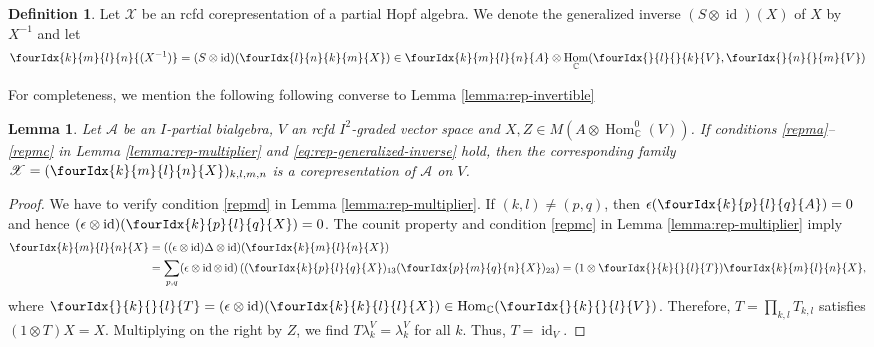\documentclass[11pt]{article}
\DeclareMathOperator{\id}{id}
\DeclareMathOperator{\Hom}{Hom}
\newcommand{\C}{\mathbb{C}}
\newcommand{\Gr}[5]{\fourIdx{#2}{#4}{#3}{#5}{#1}}%
\newcommand{\Gru}[3]{\Gr{#1}{}{}{#2}{#3}}
\newtheorem{Lem}[Theorem]{Lemma}
\theoremstyle{definition}
\newtheorem{Def}[Theorem]{Definition}
\numberwithin{equation}{section}
\begin{document}
\begin{Def}
  Let $\mathscr{X}$ be an rcfd corepresentation of a  partial Hopf
  algebra.  We  denote the generalized inverse $(S \otimes \id)(X)$
  of $X$  by $X^{-1}$ and let
  \begin{align*}
   \Gr{(X^{-1})}{k}{l}{m}{n}=(S \otimes \id)(\Gr{X}{l}{k}{n}{m}) \in
   \Gr{A}{k}{l}{m}{n} \otimes \Hom_{\C}(\Gru{V}{l}{k},\Gru{V}{n}{m})
  \end{align*}
\end{Def}
For completeness, we mention the following following converse to Lemma \ref{lemma:rep-invertible}
\begin{Lem}
  Let $\mathscr{A}$ be an $I$-partial bialgebra, $V$ an rcfd $I^{2}$-graded vector space and $X,Z \in M(A \otimes
  \Hom_{\C}^{0}(V))$. If conditions \ref{repma}--\ref{repmc} in Lemma
  \ref{lemma:rep-multiplier} and
  \eqref{eq:rep-generalized-inverse} hold, then the corresponding
  family $\mathscr{X}=(\Gr{X}{k}{l}{m}{n})_{k,l,m,n}$ is a
  corepresentation of $\mathscr{A}$ on $V$.
\end{Lem}
\begin{proof}
  We have to verify condition \ref{repmd} in Lemma
  \ref{lemma:rep-multiplier}.  If $(k,l) \neq (p,q)$, then
  $\epsilon(\Gr{A}{k}{l}{p}{q})=0$ and hence $(\epsilon
  \otimes \id)(\Gr{X}{k}{l}{p}{q}) =0$. The counit property and condition
  \ref{repmc} in Lemma \ref{lemma:rep-multiplier} imply 
\begin{align*}
  \Gr{X}{k}{l}{m}{n} &= ((\epsilon\otimes \id)  \Delta \otimes
  \id)(  \Gr{X}{k}{l}{m}{n}) 
\\ &  = \sum_{p,q} (\epsilon\otimes \id \otimes
  \id)\left((\Gr{X}{k}{l}{p}{q})_{13}(\Gr{X}{p}{q}{m}{n})_{23}\right)
  =  (1 \otimes \Gru{T}{k}{l})\Gr{X}{k}{l}{m}{n},
\end{align*}
where $\Gru{T}{k}{l}=(\epsilon \otimes \id)(\Gr{X}{k}{l}{k}{l}) \in
\Hom_{\C}(\Gru{V}{k}{l})$.  Therefore,  $T=\prod_{k,l} T_{k,l}$  satisfies $(1 \otimes T)X =
X$. Multiplying on the right by $Z$, we find
$T\lambda^{V}_{k}=\lambda^{V}_{k}$ for all $k$. Thus, $T=\id_{V}$.
\end{proof}
\end{document}
